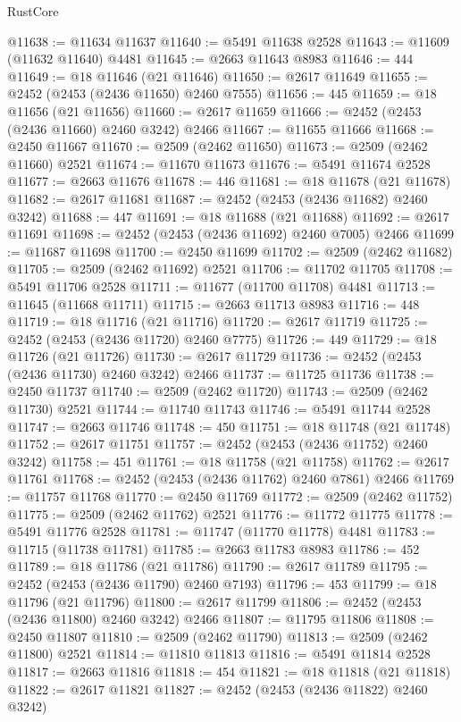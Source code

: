 \begin{lexlean}{RustCore}
\begin{coremodule}
@11638 := @11634 @11637
@11640 := @5491 @11638 @2528
@11643 := @11609 (@11632 @11640) @4481
@11645 := @2663 @11643 @8983
@11646 := 444
@11649 := @18 @11646 (@21 @11646)
@11650 := @2617 @11649
@11655 := @2452 (@2453 (@2436 @11650) @2460 @7555)
@11656 := 445
@11659 := @18 @11656 (@21 @11656)
@11660 := @2617 @11659
@11666 := @2452 (@2453 (@2436 @11660) @2460 @3242) @2466
@11667 := @11655 @11666
@11668 := @2450 @11667
@11670 := @2509 (@2462 @11650)
@11673 := @2509 (@2462 @11660) @2521
@11674 := @11670 @11673
@11676 := @5491 @11674 @2528
@11677 := @2663 @11676
@11678 := 446
@11681 := @18 @11678 (@21 @11678)
@11682 := @2617 @11681
@11687 := @2452 (@2453 (@2436 @11682) @2460 @3242)
@11688 := 447
@11691 := @18 @11688 (@21 @11688)
@11692 := @2617 @11691
@11698 := @2452 (@2453 (@2436 @11692) @2460 @7005) @2466
@11699 := @11687 @11698
@11700 := @2450 @11699
@11702 := @2509 (@2462 @11682)
@11705 := @2509 (@2462 @11692) @2521
@11706 := @11702 @11705
@11708 := @5491 @11706 @2528
@11711 := @11677 (@11700 @11708) @4481
@11713 := @11645 (@11668 @11711)
@11715 := @2663 @11713 @8983
@11716 := 448
@11719 := @18 @11716 (@21 @11716)
@11720 := @2617 @11719
@11725 := @2452 (@2453 (@2436 @11720) @2460 @7775)
@11726 := 449
@11729 := @18 @11726 (@21 @11726)
@11730 := @2617 @11729
@11736 := @2452 (@2453 (@2436 @11730) @2460 @3242) @2466
@11737 := @11725 @11736
@11738 := @2450 @11737
@11740 := @2509 (@2462 @11720)
@11743 := @2509 (@2462 @11730) @2521
@11744 := @11740 @11743
@11746 := @5491 @11744 @2528
@11747 := @2663 @11746
@11748 := 450
@11751 := @18 @11748 (@21 @11748)
@11752 := @2617 @11751
@11757 := @2452 (@2453 (@2436 @11752) @2460 @3242)
@11758 := 451
@11761 := @18 @11758 (@21 @11758)
@11762 := @2617 @11761
@11768 := @2452 (@2453 (@2436 @11762) @2460 @7861) @2466
@11769 := @11757 @11768
@11770 := @2450 @11769
@11772 := @2509 (@2462 @11752)
@11775 := @2509 (@2462 @11762) @2521
@11776 := @11772 @11775
@11778 := @5491 @11776 @2528
@11781 := @11747 (@11770 @11778) @4481
@11783 := @11715 (@11738 @11781)
@11785 := @2663 @11783 @8983
@11786 := 452
@11789 := @18 @11786 (@21 @11786)
@11790 := @2617 @11789
@11795 := @2452 (@2453 (@2436 @11790) @2460 @7193)
@11796 := 453
@11799 := @18 @11796 (@21 @11796)
@11800 := @2617 @11799
@11806 := @2452 (@2453 (@2436 @11800) @2460 @3242) @2466
@11807 := @11795 @11806
@11808 := @2450 @11807
@11810 := @2509 (@2462 @11790)
@11813 := @2509 (@2462 @11800) @2521
@11814 := @11810 @11813
@11816 := @5491 @11814 @2528
@11817 := @2663 @11816
@11818 := 454
@11821 := @18 @11818 (@21 @11818)
@11822 := @2617 @11821
@11827 := @2452 (@2453 (@2436 @11822) @2460 @3242)

\end{coremodule}
\end{lexlean}
